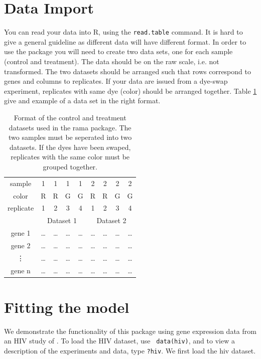 \documentclass[11pt]{article}
\begin{document}
\section{Data Import}

You can read your data into R,  using the {\tt read.table} command. 
It is hard to give a general guideline as different data will have different format. In order to use the package you will need 
to create two data sets, one for each sample (control and treatment). The data should be on the raw scale, i.e. not transformed. 
The two datasets should be arranged such that rows correspond to genes and columns to replicates. 
If your data are issued from a dye-swap experiment, replicates with same dye (color) should be arranged together. 
Table \ref{tab:data_format} give and example of a data set in the right format. 

\begin{table}[htbp]
  \caption{Format of the control and treatment datasets used in the rama package. 
    The two samples must be seperated into two datasets. If the dyes have been swaped, replicates
    with the same color must be grouped together.}
  \centering
  \begin{tabular}{ccccccccc}\hline \hline
    sample & 1 & 1 & 1 & 1 & 2 & 2 & 2 & 2  \\
    color & R & R & G & G & R & R & G & G \\
    replicate & 1 & 2 & 3 & 4 & 1 & 2 & 3 & 4 \\ \hline
    & \multicolumn{4}{c}{Dataset 1} & \multicolumn{4}{c}{Dataset 2} \\ \cline{2-5} \cline{6-9}
    gene 1 &  \dots & \dots & \dots & \dots & \dots & \dots & \dots & \dots \\
    gene 2 &  \dots  & \dots & \dots & \dots & \dots & \dots & \dots & \dots \\ 
    \vdots &  \dots  & \dots & \dots & \dots & \dots & \dots & \dots & \dots \\ 
    gene n &  \dots  & \dots & \dots & \dots & \dots & \dots & \dots & \dots \\ \hline
  \end{tabular}
  \label{tab:data_format}
\end{table}


\section{Fitting the model} 


We demonstrate the functionality of this package using gene
 expression data from an HIV study of . 
 To load the HIV dataset, use {\tt
   data(hiv)}, and to view a description of the experiments and
 data, type {\tt ?hiv}. We first load the hiv dataset.  
\end{document}
